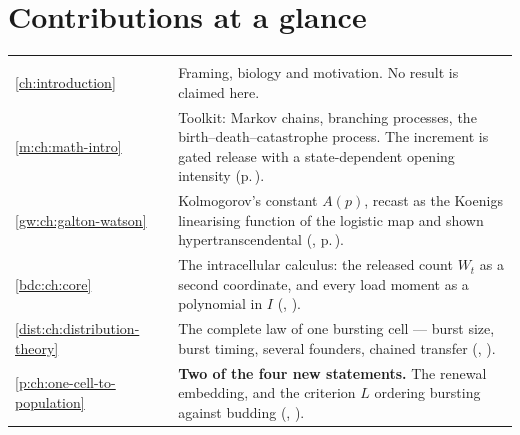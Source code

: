 \chapter*{Contributions at a glance}
\label{oi:summary}
\begingroup
\setlength{\parindent}{0pt}
\setlength{\parskip}{0pt}
\renewcommand{\arraystretch}{1.18}

\vspace{0.15\baselineskip}
{\footnotesize
\begin{xltabular}{\linewidth}{@{}p{7mm}p{18mm}O@{}}
\toprule
{} &  &  \\
\midrule
\endfirsthead
\toprule
{} &  &  \\
\midrule
\endhead
\bottomrule
\endlastfoot
\ref{ch:introduction} &  & Framing, biology and motivation. No result is claimed here. \\
\ref{m:ch:math-intro} &  & Toolkit: Markov chains, branching processes, the birth--death--catastrophe process. The increment is gated release with a state-dependent opening intensity (p.\,\pageref{m:sec:gated}). \\
\ref{gw:ch:galton-watson} &  & Kolmogorov's constant $A(p)$, recast as the Koenigs linearising function of the logistic map and shown hypertranscendental (, p.\,\pageref{gw:thm:main}). \\
\ref{bdc:ch:core} &  & The intracellular calculus: the released count $W_t$ as a second coordinate, and every load moment as a polynomial in $I$ (, ). \\
\ref{dist:ch:distribution-theory} &  & The complete law of one bursting cell --- burst size, burst timing, several founders, chained transfer (, ). \\
\ref{p:ch:one-cell-to-population} &  & \textbf{Two of the four new statements.} The renewal embedding, and the criterion $L$ ordering bursting against budding (, ). \\

\end{xltabular}}
